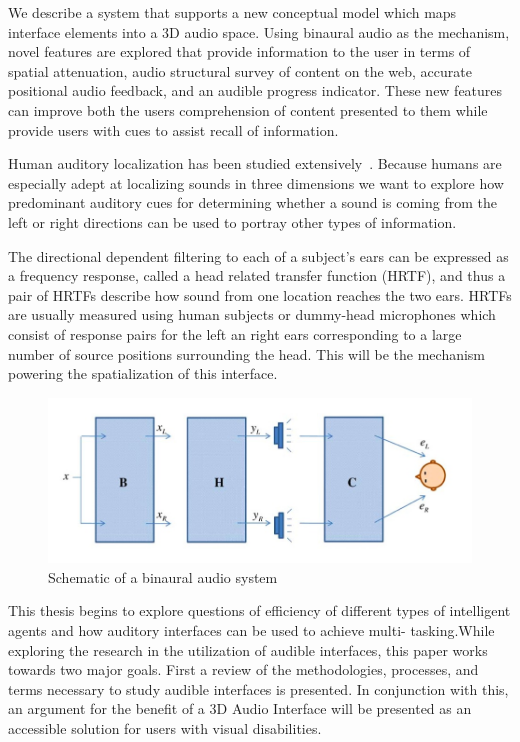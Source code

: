 We describe a system that supports a new conceptual model which maps interface
elements into a 3D audio space. Using binaural audio as the mechanism, novel
features are explored that provide information to the user in terms of spatial
attenuation, audio structural survey of content on the web, accurate positional
audio feedback, and an audible progress indicator.  These new features can
improve both the users comprehension of content presented to them while provide
users with cues to assist recall of information.

Human auditory localization has been studied extensively~\cite{
yost1987directional, blauert1997spatial }. Because humans are especially adept
at localizing sounds in three dimensions we want to explore how predominant
auditory cues for determining whether a sound is coming from the left or right
directions can be used to portray other types of information.

The directional dependent filtering to each of a subject's ears can be expressed
as a frequency response, called a head related transfer function (HRTF), and
thus a pair of HRTFs describe how sound from one location reaches the two ears.
HRTFs are usually measured using human subjects or dummy-head microphones which
consist of response pairs for the left an right ears corresponding to a large
number of source positions surrounding the head. This will be the mechanism
powering the spatialization of this interface.

\begin{figure}[h]
  \centering
  \includegraphics[width=1\textwidth]{images/binaural_diagram.jpg}
  \caption{Schematic of a binaural audio system}
\end{figure}


This thesis begins to explore questions of efficiency of different types of
intelligent agents and how auditory interfaces can be used to achieve  multi-
tasking.While exploring the research in the utilization of audible interfaces,
this paper works towards two major goals. First a review of the methodologies,
processes, and terms necessary to study audible interfaces is presented. In
conjunction with this, an argument for the benefit of a 3D Audio Interface will
be presented as an accessible solution for users with visual disabilities.

